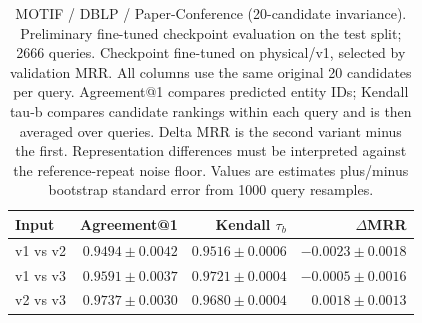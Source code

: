 \begin{table}[t]
\centering
\small
\begin{tabular}{lrrr}
\toprule
Input & Agreement@1 & Kendall $\tau_b$ & $\Delta$MRR \\
\midrule
v1 vs v2 & $0.9494 \pm 0.0042$ & $0.9516 \pm 0.0006$ & $-0.0023 \pm 0.0018$ \\
v1 vs v3 & $0.9591 \pm 0.0037$ & $0.9721 \pm 0.0004$ & $-0.0005 \pm 0.0016$ \\
v2 vs v3 & $0.9737 \pm 0.0030$ & $0.9680 \pm 0.0004$ & $0.0018 \pm 0.0013$ \\
\bottomrule
\end{tabular}
\caption{MOTIF / DBLP / Paper-Conference (20-candidate invariance). Preliminary fine-tuned checkpoint evaluation on the test split; 2666 queries. Checkpoint fine-tuned on physical/v1, selected by validation MRR. All columns use the same original 20 candidates per query. Agreement@1 compares predicted entity IDs; Kendall tau-b compares candidate rankings within each query and is then averaged over queries. Delta MRR is the second variant minus the first. Representation differences must be interpreted against the reference-repeat noise floor. Values are estimates plus/minus bootstrap standard error from 1000 query resamples.}
\label{tab:motif-paper_conference-invariance}
\end{table}
